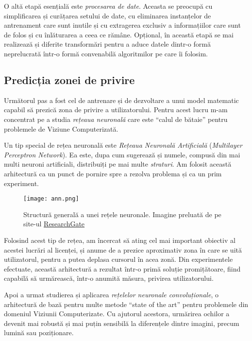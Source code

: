 O altă etapă esențială este \emph{procesarea de date}.
Aceasta se preocupă cu simplificarea și curățarea setului de date, cu eliminarea instanțelor de antrenament care sunt inutile și cu extragerea exclusiv a informațiilor care sunt de folos și cu înlăturarea a ceea ce rămâne.
Opțional, în această etapă se mai realizează și diferite transformări pentru a aduce datele dintr-o formă neprelucrată într-o formă convenabilă algoritmilor pe care îi folosim.

\subsection{Predicția zonei de privire}
Următorul pas a fost cel de antrenare și de dezvoltare a unui model matematic capabil să prezică zona de privire a utilizatorului.
Pentru acest lucru m-am concentrat pe a studia \emph{rețeaua neuronală} care este ``calul de bătaie'' pentru problemele de Viziune Computerizată.

Un tip special de rețea neuronală este \emph{Rețeaua Neuronală Artificială} (\emph{Multilayer Perceptron Network}).
Ea este, dupa cum sugerează și numele, compusă din mai multi neuroni artificiali, distribuiți pe mai multe \emph{straturi}.
Am folosit această arhitectură ca un punct de pornire spre a rezolva problema și ca un prim experiment.

\begin{figure}[ht]
    \centering
    \texttt{[image: ann.png]}
    \caption{Structură generală a unei rețele neuronale. Imagine preluată de pe site-ul \href{https://www.researchgate.net/figure/Deep-learning-diagram_fig5_323784695}{ResearchGate}}
\end{figure}

Folosind acest tip de rețea, am încercat să ating cel mai important obiectiv al acestei lucrări al licenței, și anume de a prezice aproximativ zona în care se uită utilizatorul, pentru a putea deplasa cursorul în acea zonă.
Din experimentele efectuate, această arhitectură a rezultat într-o primă soluție promițătoare, fiind capabilă să urmărească, într-o anumită măsura, privirea utilizatorului.

Apoi a urmat studierea și aplicarea \emph{rețelelor neuronale convoluționale}, o arhitectură de bază pentru multe metode ``state of the art'' pentru problemele din domeniul Viziunii Computerizate.
Cu ajutorul acestora, urmărirea ochilor a devenit mai robustă și mai puțin sensibilă la diferențele dintre imagini, precum lumină sau poziționare.

